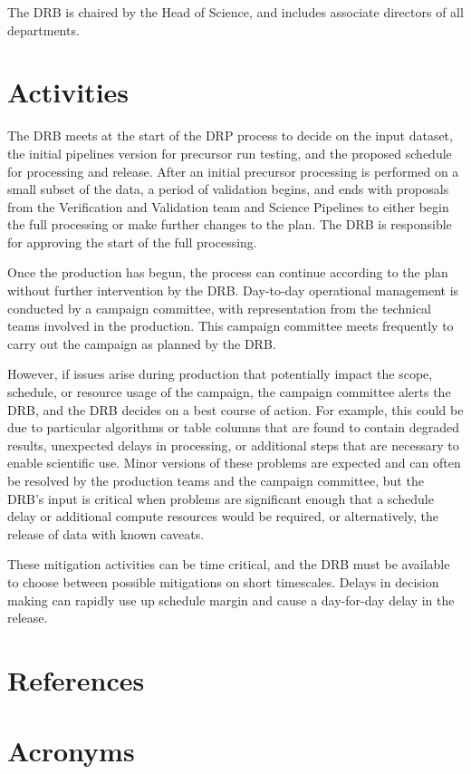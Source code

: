 \documentclass[OPS,authoryear,toc,lsstdraft]{lsstdoc}
\begin{document}
The DRB is chaired by the Head of Science, and includes associate directors of all departments.

\section{Activities}

The DRB meets at the start of the DRP process to decide on the input dataset, the initial pipelines
version for precursor run testing, and the proposed schedule for processing and release. After an
initial precursor processing is performed on a small subset of the data, a period of validation
begins, and ends with proposals from the Verification and Validation team and Science Pipelines to
either begin the full processing or make further changes to the plan. The DRB is responsible for
approving the start of the full processing.

Once the production has begun, the process can continue according to the plan without further
intervention by the DRB. Day-to-day operational management is conducted by a campaign committee,
with representation from the technical teams involved in the production. This campaign committee
meets frequently to carry out the campaign as planned by the DRB.

However, if issues arise during production that potentially impact the scope, schedule, or resource
usage of the campaign, the campaign committee alerts the DRB, and the DRB decides on a best course
of action. For example, this could be due to particular algorithms or table columns that are found
to contain degraded results, unexpected delays in processing, or additional steps that are necessary
to enable scientific use. Minor versions of these problems are expected and can often be resolved by
the production teams and the campaign committee, but the DRB's input is critical when problems are
significant enough that a schedule delay or additional compute resources would be required, or
alternatively, the release of data with known caveats.

These mitigation activities can be time critical, and the DRB must be available to choose between
possible mitigations on short timescales. Delays in decision making can rapidly use up schedule
margin and cause a day-for-day delay in the release.



\appendix
\section{References} \label{sec:bib}
\renewcommand{\refname}{} %


\section{Acronyms} \label{sec:acronyms}

\end{document}
